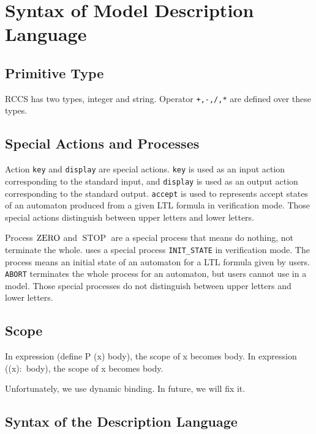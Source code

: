 \documentclass[12pt,a4paper,titlepage]{article}
\theoremstyle{break}
\begin{document}
\section{Syntax of Model Description Language}
\subsection{Primitive Type}
RCCS has two types, integer and string.
Operator {\tt +,-,/,*} are defined over these types.
\subsection{Special Actions and Processes}
Action {\tt key} and {\tt display} are special actions. 
{\tt key} is used as an input action corresponding to the standard input, and {\tt display} is used as an output action corresponding to the standard output.
{\tt accept} is used to represents accept states of an automaton produced from a given LTL formula in verification mode.
Those special actions distinguish between upper letters and lower letters.

Process \(\mathop{\mathrm{ZERO}}\nolimits\) and \({\mathop{\mathrm{STOP}}\nolimits}\) are a special process that means do nothing, not terminate the whole.
\NHK uses a special process {\tt INIT\_STATE} in verification mode.
The process means an initial state of an automaton for a LTL formula given by users.
{\tt ABORT} terminates the whole process for an automaton, but users cannot use in a model.
Those special processes do not distinguish between upper letters and lower letters.
\subsection{Scope}
In expression (define P (x) body), the scope of x becomes body.
In expression ((x)\(\colon\) body), the scope of x becomes body.

Unfortunately, we use dynamic binding.
In future, we will fix it.
\subsection{Syntax of the Description Language}\label{sec:RCCSsyntax}

\end{document}
